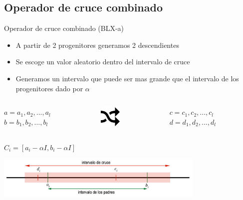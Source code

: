 \documentclass[10pt]{beamer}
\begin{document}
\subsection{Operador de cruce combinado}

\begin{frame}{Operador de cruce combinado (BLX-a)}
	\begin{itemize}
		\item A partir de 2 progenitores generamos 2 descendientes
		\item Se escoge un valor aleatorio dentro del intervalo de cruce
		\item Generamos un intervalo que puede ser mas grande que el intervalo de los progenitores dado por $\alpha$
	\end{itemize}
	\begin{columns}[t]
		\begin{column}{0.4\textwidth}
			\begin{flushright}
				$a=a_{1} , a_{2}, ... , a_{l}$
				\\ $b=b_{1} , b_{2}, ... , b_{l}$ 
			\end{flushright}
		\end{column}
		\begin{column}{0.2\textwidth}
			\begin{center}
				\includegraphics[width=1cm]{arrow}
			\end{center}
		\end{column}
		\begin{column}{0.4\textwidth}
			\begin{flushleft}
				$c=c_{1} , c_{2}, ... , c_{l}$
				\\ $d=d_{1} , d_{2}, ... , d_{l}$ 
			\end{flushleft}
		\end{column}
	\end{columns}
	
	\begin{center}
		$C_{i}=[a_i - \alpha I , b_i - \alpha I]$
		
		\vspace{5mm}
		\includegraphics[width=10cm]{crucecombinado}
	\end{center}	
\end{frame}
\end{document}
